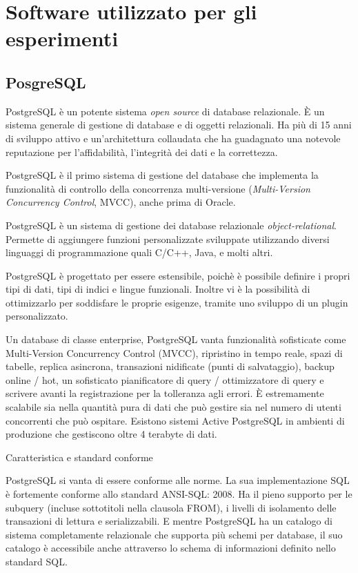 \section{Software utilizzato per gli esperimenti}
\item
\subsection{PosgreSQL}

PostgreSQL \`{e} un potente sistema \textit{open source} di database relazionale. \`{E} un sistema generale di gestione di database e di oggetti relazionali. Ha pi\`{u} di 15 anni di sviluppo attivo e un'architettura collaudata che ha guadagnato una notevole reputazione per l'affidabilit\`{a}, l'integrit\`{a} dei dati e la correttezza.\cite{etichetta12}

PostgreSQL \`{e} il primo sistema di gestione del database che implementa la funzionalit\`{a} di controllo della concorrenza multi-versione (\textit{Multi-Version Concurrency Control}, MVCC), anche prima di Oracle.

PostgreSQL \`{e} un sistema di gestione dei database relazionale \textit{object-relational}. Permette di aggiungere funzioni personalizzate sviluppate utilizzando diversi linguaggi di programmazione quali C/C++, Java, e molti altri.\cite{etichetta12}

PostgreSQL \`{e} progettato per essere estensibile, poichè \`{e} possibile definire i propri tipi di dati, tipi di indici e lingue funzionali. Inoltre vi \`{e} la possibilit\`{a} di ottimizzarlo per soddisfare le proprie esigenze, tramite uno sviluppo di un plugin personalizzato.

Un database di classe enterprise, PostgreSQL vanta funzionalit\`{a} sofisticate come Multi-Version Concurrency Control (MVCC), ripristino in tempo reale, spazi di tabelle, replica asincrona, transazioni nidificate (punti di salvataggio), backup online / hot, un sofisticato pianificatore di query / ottimizzatore di query e scrivere avanti la registrazione per la tolleranza agli errori. È estremamente scalabile sia nella quantit\`{a} pura di dati che pu\`{o} gestire sia nel numero di utenti concorrenti che pu\`{o} ospitare. Esistono sistemi Active PostgreSQL in ambienti di produzione che gestiscono oltre 4 terabyte di dati. 


Caratteristica e standard conforme

PostgreSQL si vanta di essere conforme alle norme. La sua implementazione SQL è fortemente conforme allo standard ANSI-SQL: 2008. Ha il pieno supporto per le subquery (incluse sottotitoli nella clausola FROM), i livelli di isolamento delle transazioni di lettura e serializzabili. E mentre PostgreSQL ha un catalogo di sistema completamente relazionale che supporta pi\`{u} schemi per database, il suo catalogo \`{e} accessibile anche attraverso lo schema di informazioni definito nello standard SQL.


